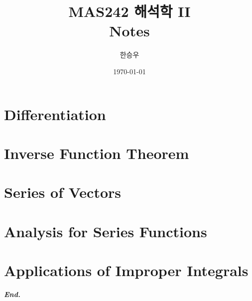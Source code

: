 \documentclass[a4paper,12pt]{report}
\title{\Huge{MAS242 해석학 II}\\Notes}
\author{\huge{한승우}}
\date{\today}
\begin{document}

\maketitle
\newpage
{}
\tikzexternaldisable
\tableofcontents
\tikzexternalenable
\pagebreak

\chapter{Differentiation}

\chapter{Inverse Function Theorem}

\chapter{Series of Vectors}

\chapter{Analysis for Series Functions}

\chapter{Applications of Improper Integrals}

\vfill
\begin{center}
    \textbf{\textit{End.}}
\end{center}
\end{document}
